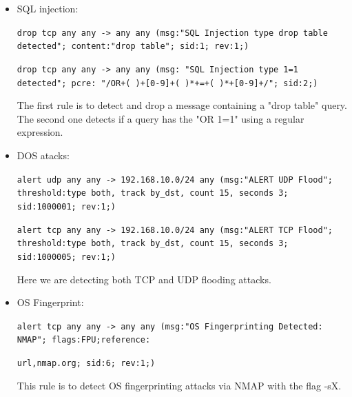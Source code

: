 \documentclass{article}
\begin{document}
\begin{itemize}
    \item SQL injection:\par
    \texttt{drop tcp any any -> any any (msg:"SQL Injection type drop table detected"; content:"drop table"; sid:1; rev:1;)}\par
    \texttt{drop tcp any any -> any any (msg: "SQL Injection type 1=1 detected"; pcre: "/OR+( )+[0-9]+( )*+=+( )*+[0-9]+/"; sid:2;)}\par
    \texttt{}\par
    The first rule is to detect and drop a message containing a "drop table" query. The second one detects if a query has the "OR 1=1" using a regular expression. \par
    

    \item DOS atacks:\par
    \texttt{alert udp any any -> 192.168.10.0/24 any (msg:"ALERT UDP Flood"; threshold:type both, track by\_dst, count 15, seconds 3; sid:1000001; rev:1;)}\par
    \texttt{alert tcp any any -> 192.168.10.0/24 any (msg:"ALERT TCP Flood"; threshold:type both, track by\_dst, count 15, seconds 3; sid:1000005; rev:1;)}\par

    \texttt{}\par
    Here we are detecting both TCP and UDP flooding attacks.\par


    \item OS Fingerprint:\par
    \texttt{alert tcp any any -> any any (msg:"OS Fingerprinting Detected: NMAP"; flags:FPU;reference:}\par
    \texttt{url,nmap.org; sid:6; rev:1;)}\par

    \texttt{}\par
    This rule is to detect OS fingerprinting attacks via NMAP with the flag -sX.  
    
    \texttt{}\par
\end{itemize}
\end{document}
